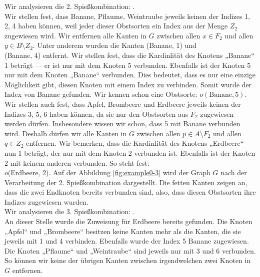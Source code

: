Wir analysieren die 2. Spießkombination:
.\\
Wir stellen fest, dass Banane, Pflaume, Weintraube jeweils keinen der Indizes 1, 2, 4 haben können,
weil jeder dieser Obstsorten ein Index aus der Menge $Z_2$ zugewiesen wird. 
Wir entfernen alle Kanten in $G$ zwischen allen $x \in F_2$ und allen $y \in B \setminus Z_2$.
Unter anderem wurden die Kanten (Banane, 1) und\\ (Banane, 4) entfernt.
Wir stellen fest, dass die Kardinlität des Knotens „Banane“ 1 beträgt --- er ist nur mit dem Knoten 5 verbunden.
Ebenfalls ist der Knoten 5 nur mit dem Knoten „Banane“ verbunden.
Dies bedeutet, dass es nur eine einzige Möglichkeit gibt, diesen Knoten mit einem Index zu verbinden.
Somit wurde der Index von Banane gefunden. Wir kennen schon eine Obstsorte: $o(\text{Banane}, 5)$.\\
Wir stellen auch fest, dass Apfel, Brombeere und Erdbeere jeweils keinen der Indizes 3, 5, 6 haben können,
da sie nur den Obstsorten aus $F_2$ zugewiesen werden dürfen.
Insbesondere wissen wir schon, dass 5 mit Banane verbunden wird.
Deshalb dürfen wir alle Kanten in $G$ zwischen allen $p \in A \setminus F_2$ und allen $q \in Z_2$ entfernen.
Wir bemerken, dass die Kardinlität des Knotens „Erdbeere“ nun 1 beträgt, der nur mit dem Knoten 2 verbunden ist.
Ebenfalls ist der Knoten 2 mit keinem anderen verbunden. So steht fest:\\ $o$(Erdbeere, 2).
Auf der Abbildung \ref{fig:example0-3} wird der Graph $G$ nach der Verarbeitung der 2. Spießkombination
dargestellt. Die fetten Kanten zeigen an, dass die zwei Endknoten bereits verbunden sind, also, dass 
diesen Obstsorten ihre Indizes zugewiesen wurden.\\

Wir analysieren die 3. Spießkombination:
.\\
An dieser Stelle wurde die Zuweisung für Erdbeere bereits gefunden.
Die Knoten „Apfel“ und „Brombeere“ besitzen keine Kanten mehr als die Kanten, die sie jeweils mit 1 und 4 verbinden. 
Ebenfalls wurde der Index 5 Banane zugewiesen.
Die Knoten „Pflaume“ und „Weintraube“ sind jeweils nur mit 3 und 6 verbunden.
So können wir keine der übrigen Kanten zwischen irgendwelchen zwei Knoten in $G$ entfernen.\\

